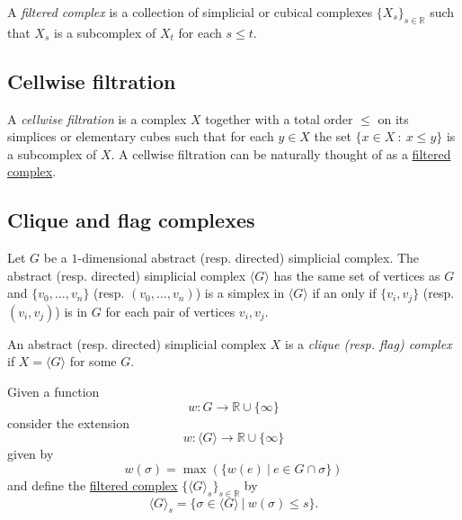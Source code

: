 \documentclass{amsart}
\begin{document}
	A \textit{filtered complex} is a collection of simplicial or cubical complexes $\{X_s\}_{s \in \mathbb R}$ such that $X_s$ is a subcomplex of $X_t$ for each $s \leq t$.
	
	\subsection*{Cellwise filtration} \label{cellwise filtration}
	
	A \textit{cellwise filtration} is a complex $X$ together with a total order $\leq$ on its simplices or elementary cubes such that for each $y \in X$ the set $\{x \in X\ :\ x \leq y\}$ is a subcomplex of $X$. A cellwise filtration can be naturally thought of as a \hyperref[filtered complex]{filtered complex}.
	
	\subsection*{Clique and flag complexes} \label{clique and flag complexes}
	
	Let $G$ be a $1$-dimensional abstract (resp. directed) simplicial complex. The abstract (resp. directed) simplicial complex $\langle G \rangle$ has the same set of vertices as $G$ and $\{v_0, \dots, v_n\}$ \big(resp. $(v_0, \dots, v_n)$\big) is a simplex in $\langle G \rangle$ if an only if $\{v_i, v_j\}$ \big(resp. $(v_i, v_j)$\big) is in $G$ for each pair of vertices $v_i, v_j$. 
	
	An abstract (resp. directed) simplicial complex $X$ is a \textit{clique (resp. flag) complex} if $X = \langle G \rangle$ for some $G$.
	
	Given a function
	\begin{equation*}
	w : G \to \mathbb R \cup \{\infty\}
	\end{equation*}
	consider the extension
	\begin{equation*}
	w : \langle G \rangle \to \mathbb R \cup \{\infty\}
	\end{equation*}
	given by
	\begin{equation*}
	w(\sigma) = \max(\{ w(e)\ |\ e \in G \cap \sigma\})
	\end{equation*}
	and define the \hyperref[filtered complex]{filtered complex} $\{\langle G \rangle_{s}\}_{s \in \mathbb R}$ by
	\begin{equation*}
	\langle G \rangle_s = \{\sigma \in \langle G \rangle\ |\ w(\sigma) \leq s\}.
	\end{equation*}
	
\end{document}
